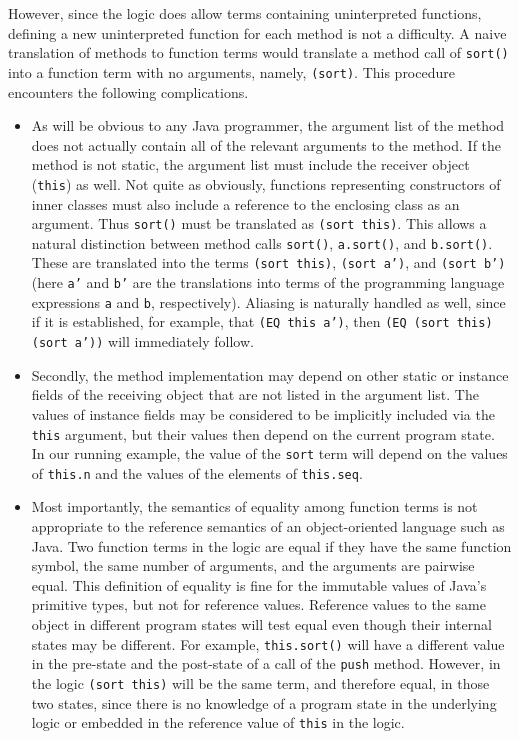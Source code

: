 \documentclass{sig-alternate}
\begin{document}
However, since the logic does allow terms containing uninterpreted functions, defining a new
uninterpreted function for each method is not a difficulty.  A naive translation of methods to
function terms would translate a method call of \texttt{sort()} into a function term with no
arguments, namely, \texttt{(sort)}.  This procedure encounters the following complications.
\begin{itemize}
\item
As will be obvious to any Java programmer, the argument list of the method does not 
actually contain all of the relevant arguments to the method.  If the method is not static, the
argument list must include the receiver object (\texttt{this}) as well.  Not quite as obviously,
functions representing constructors of inner classes must also include a reference to the
enclosing class as an argument.  Thus \texttt{sort()} must be translated as \texttt{(sort this)}.
This allows a natural distinction between method calls \texttt{sort()}, \texttt{a.sort()}, and
\texttt{b.sort()}.  These are translated into the terms \texttt{(sort this)}, \texttt{(sort a')}, and
\texttt{(sort b')} (here \texttt{a'} and \texttt{b'} are the translations into terms of
the programming language expressions \texttt{a} and \texttt{b}, respectively).  
Aliasing is naturally handled as well, since if it is established, for example, that
\texttt{(EQ this a')}, then \texttt{(EQ (sort this) (sort a'))} will immediately follow.

\item
Secondly, the method implementation may depend on other static or instance fields
of the receiving object that are not listed in the argument list.  The values of instance fields
may be considered to be implicitly included via the \texttt{this} argument, but their values then
depend on the current program state.  In our running example, the value of the \texttt{sort} term
will depend on the values of \texttt{this.n} and the values of the elements of \texttt{this.seq}.

\item
Most importantly, the semantics of equality among function terms is not appropriate to the
reference semantics of an object-oriented language such as Java.  Two function terms in the
logic are equal if they have the same function symbol, the same number of arguments, and the
arguments are pairwise equal.  This definition of equality is fine for the immutable
values of Java's primitive types, but not for reference values.  Reference values to the
same object in different program
states will test equal even though their internal states may be different.  For example,
\texttt{this.sort()} will have a different value in the pre-state and the post-state of a call of the 
\texttt{push} method.  However, in the logic \texttt{(sort this)} will be the same term, and therefore
equal, in those two states, since there is no knowledge of a program state in the underlying
logic or embedded in the reference value of \texttt{this} in the logic.
\end{itemize}
\end{document}
